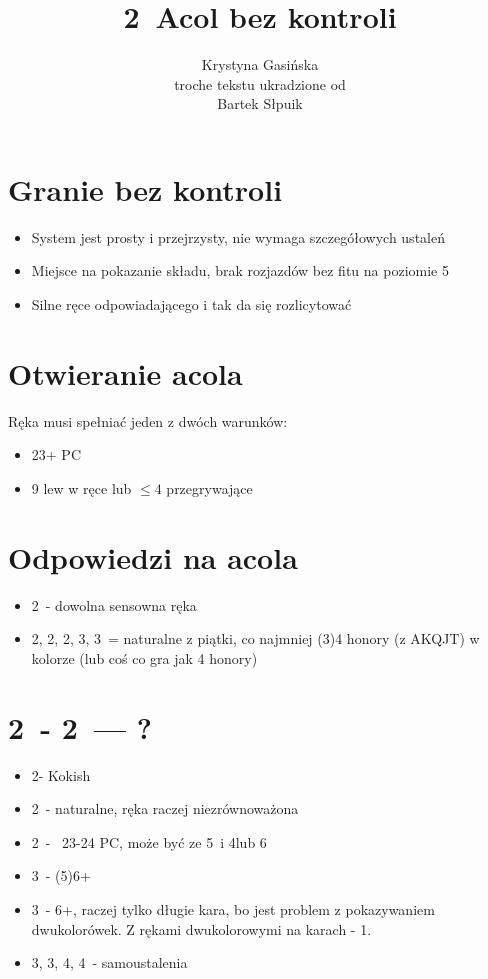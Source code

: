 \documentclass[12pt, a4paper]{article}
\author{Krystyna Gasińska\\\small{troche tekstu ukradzione od}\\Bartek Słpuik}
\date{}
\title{2\clubs\ Acol bez kontroli}
\begin{document}
\maketitle
\section{Granie bez kontroli}
\begin{itemize}
    \item System jest prosty i przejrzysty, nie wymaga szczegółowych ustaleń
    \item Miejsce na pokazanie składu, brak rozjazdów bez fitu na poziomie 5
    \item Silne ręce odpowiadającego i tak da się rozlicytować
\end{itemize}

\section{Otwieranie acola}
Ręka musi spełniać jeden z dwóch warunków:
\begin{itemize}
    \item 23+ PC
    \item 9 lew w ręce lub $\leq 4$ przegrywające
\end{itemize}

\section{Odpowiedzi na acola}
\begin{itemize}
    \item 2\diams\ - dowolna sensowna ręka
    \item 2\hearts, 2\spades, 2\nt, 3\clubs, 3\diams\ = naturalne z piątki,
    co najmniej (3)4 honory (z AKQJT) w kolorze (lub coś co gra jak 4 honory)
\end{itemize}


\pagebreak
\section{2\clubs\ - 2\diams\ --- ?}
\begin{itemize}
    \item 2\hearts - Kokish
    \item 2\spades\ - naturalne, ręka raczej niezrównoważona
    \item 2\nt\ - \bal\ 23-24 PC, może być ze 5\major\ i 4\minor lub 6
    \item 3\clubs\ - (5)6+\clubs
    \item 3\diams\ - 6+\diams, raczej tylko długie kara, bo jest problem z pokazywaniem dwukolorówek. 
    Z rękami dwukolorowymi na karach - 1\diams.
    \item 3\hearts, 3\spades, 4\clubs, 4\diams\ - samoustalenia
\end{itemize}
\end{document}
